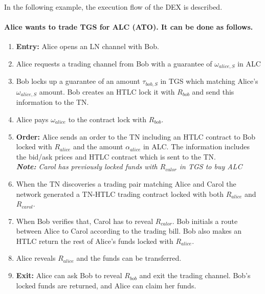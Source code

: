 In the following example, the execution flow of the DEX is described.


\paragraph{Alice wants to trade TGS for ALC (ATO). It can be done as follows.}

\begin{enumerate}[{A}.1]
 \item \textbf{Entry:} Alice opens an LN channel with Bob.
 \item Alice requests a trading channel from Bob with a guarantee of $\omega_{alice,S}$ in ALC 
 \item Bob locks up a guarantee of an amount $\tau_{bob,S}$ in TGS which matching Alice's $\omega_{alice,S}$ amount. Bob creates an HTLC lock it with $R_{bob}$ and send this information to the TN.
 \item Alice pays $\omega_{alice}$ to the contract lock with $R_{bob}$.
 \item \textbf{Order:} Alice sends an order to the TN including an HTLC contract to Bob locked with $R_{alice}$ and the amount $\alpha_{alice}$ in ALC. The information includes the bid/ask prices and HTLC contract which is sent to the TN.\\
 \textit{\textbf{Note:} Carol has previously locked funds with $R_{calor}$ in TGS to buy ALC}
 \item When the TN discoveries a trading pair matching Alice and Carol the network generated a TN-HTLC trading contract locked with both $R_{alice}$ and $R_{carol}$.
 \item When Bob verifies that, Carol has to reveal $R_{calor}$. Bob initials a route between Alice to Carol according to the trading bill. Bob also makes an HTLC return the rest of Alice's funds locked with $R_{alice}$.
 \item Alice reveals $R_{alice}$ and the funds can be transferred.
 \item \textbf{Exit:} Alice can ask Bob to reveal $R_{bob}$ and exit the trading channel. Bob's locked funds are returned, and Alice can claim her funds.  
\end{enumerate}

